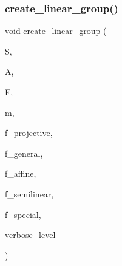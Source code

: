 \subsubsection{\texorpdfstring{create\+\_\+linear\+\_\+group()}{create\_linear\_group()}}
{\footnotesize\ttfamily void create\+\_\+linear\+\_\+group (\begin{DoxyParamCaption}\item[{\mbox{\hyperlink{classsims}{sims}} $\ast$\&}]{S,  }\item[{\mbox{\hyperlink{classaction}{action}} $\ast$\&}]{A,  }\item[{\mbox{\hyperlink{classfinite__field}{finite\+\_\+field}} $\ast$}]{F,  }\item[{\mbox{\hyperlink{galois_8h_a09fddde158a3a20bd2dcadb609de11dc}{I\+NT}}}]{m,  }\item[{\mbox{\hyperlink{galois_8h_a09fddde158a3a20bd2dcadb609de11dc}{I\+NT}}}]{f\+\_\+projective,  }\item[{\mbox{\hyperlink{galois_8h_a09fddde158a3a20bd2dcadb609de11dc}{I\+NT}}}]{f\+\_\+general,  }\item[{\mbox{\hyperlink{galois_8h_a09fddde158a3a20bd2dcadb609de11dc}{I\+NT}}}]{f\+\_\+affine,  }\item[{\mbox{\hyperlink{galois_8h_a09fddde158a3a20bd2dcadb609de11dc}{I\+NT}}}]{f\+\_\+semilinear,  }\item[{\mbox{\hyperlink{galois_8h_a09fddde158a3a20bd2dcadb609de11dc}{I\+NT}}}]{f\+\_\+special,  }\item[{\mbox{\hyperlink{galois_8h_a09fddde158a3a20bd2dcadb609de11dc}{I\+NT}}}]{verbose\+\_\+level }\end{DoxyParamCaption})}

\mbox{\label{action__global_8_c_ac46a81a18b6269aa88c7434f22b0642b}} 
